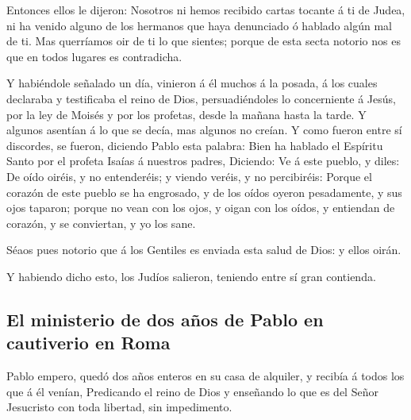  Entonces ellos le dijeron: Nosotros ni hemos recibido
cartas tocante á ti de Judea, ni ha venido alguno de los hermanos que
haya denunciado ó hablado algún mal de ti.  Mas querríamos
oir de ti lo que sientes; porque de esta secta notorio nos es que en
todos lugares es contradicha.

 Y habiéndole señalado un día, vinieron á él muchos á la
posada, á los cuales declaraba y testificaba el reino de Dios,
persuadiéndoles lo concerniente á Jesús, por la ley de Moisés y por los
profetas, desde la mañana hasta la tarde.  Y algunos
asentían á lo que se decía, mas algunos no creían.  Y como
fueron entre sí discordes, se fueron, diciendo Pablo esta palabra: Bien
ha hablado el Espíritu Santo por el profeta Isaías á nuestros padres,
 Diciendo: Ve á este pueblo, y diles: De oído oiréis, y no
entenderéis; y viendo veréis, y no percibiréis:  Porque el
corazón de este pueblo se ha engrosado, y de los oídos oyeron
pesadamente, y sus ojos taparon; porque no vean con los ojos, y oigan
con los oídos, y entiendan de corazón, y se conviertan, y yo los sane.

 Séaos pues notorio que á los Gentiles es enviada esta
salud de Dios: y ellos oirán.

 Y habiendo dicho esto, los Judíos salieron, teniendo entre
sí gran contienda.

\hypertarget{el-ministerio-de-dos-auxf1os-de-pablo-en-cautiverio-en-roma}{%
\subsection{El ministerio de dos años de Pablo en cautiverio en
Roma}\label{el-ministerio-de-dos-auxf1os-de-pablo-en-cautiverio-en-roma}}

 Pablo empero, quedó dos años enteros en su casa de
alquiler, y recibía á todos los que á él venían, 
Predicando el reino de Dios y enseñando lo que es del Señor Jesucristo
con toda libertad, sin impedimento.
